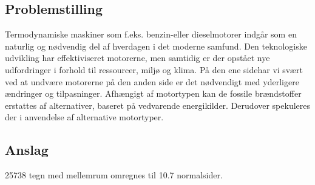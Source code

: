 \documentclass[SRC.tex]{subfiles}
\begin{document}
	\subsection*{Problemstilling}
	Termodynamiske maskiner som f.eks. benzin-eller dieselmotorer indgår som en naturlig og nødvendig del af hverdagen i det moderne samfund. Den teknologiske udvikling har effektiviseret motorerne, men samtidig er der opstået nye udfordringer i forhold til ressourcer, miljø og klima. På den ene sidehar vi svært ved at undvære motorerne på den anden side er det nødvendigt med yderligere ændringer og tilpasninger. Afhængigt af motortypen kan de fossile brændstoffer erstattes af alternativer, baseret på vedvarende energikilder.  Derudover spekuleres der i anvendelse af alternative motortyper.
	\subsection*{Anslag}
	25738 tegn med mellemrum omregnes til 10.7 normalsider.
\end{document}
